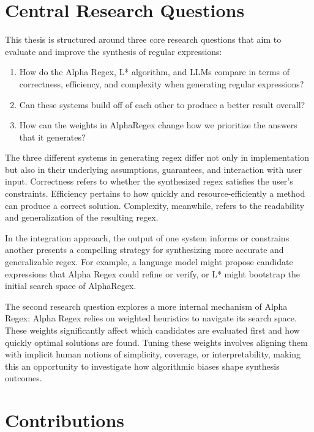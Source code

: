 \section{Central Research Questions}
\vspace{-0.4em}

\indent \indent This thesis is structured around three core research questions that aim to evaluate and improve the synthesis of regular expressions: 

\begin{enumerate}
    \item How do the Alpha Regex, L* algorithm, and LLMs compare in terms of correctness, efficiency, and complexity when generating regular expressions?
    \item Can these systems build off of each other to produce a better result overall?
    \item How can the weights in AlphaRegex change how we prioritize the answers that it generates?
\end{enumerate}

\indent \indent The three different systems in generating regex differ not only in implementation but also in their underlying assumptions, guarantees, and interaction with user input. Correctness refers to whether the synthesized regex satisfies the user's constraints. Efficiency pertains to how quickly and resource-efficiently a method can produce a correct solution. Complexity, meanwhile, refers to the readability and generalization of the resulting regex.

\indent \indent In the integration approach, the output of one system informs or constrains another presents a compelling strategy for synthesizing more accurate and generalizable regex. For example, a language model might propose candidate expressions that Alpha Regex could refine or verify, or L* might bootstrap the initial search space of AlphaRegex. 

\indent \indent The second research question explores a more internal mechanism of Alpha Regex:  Alpha Regex relies on weighted heuristics to navigate its search space. These weights significantly affect which candidates are evaluated first and how quickly optimal solutions are found. Tuning these weights involves aligning them with implicit human notions of simplicity, coverage, or interpretability, making this an opportunity to investigate how algorithmic biases shape synthesis outcomes.

\vspace{-0.4em}
\section{Contributions}
\vspace{-0.4em}

